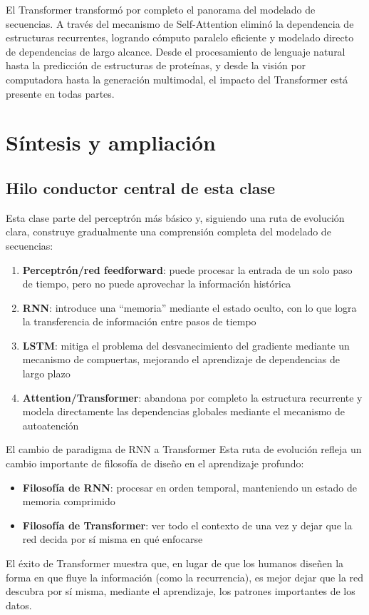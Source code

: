 \documentclass[a4paper]{article}
\begin{document}
El Transformer transformó por completo el panorama del modelado de secuencias. A través del mecanismo de Self-Attention eliminó la dependencia de estructuras recurrentes, logrando cómputo paralelo eficiente y modelado directo de dependencias de largo alcance. Desde el procesamiento de lenguaje natural hasta la predicción de estructuras de proteínas, y desde la visión por computadora hasta la generación multimodal, el impacto del Transformer está presente en todas partes.

\newpage
\section{Síntesis y ampliación}

\subsection{Hilo conductor central de esta clase}

Esta clase parte del perceptrón más básico y, siguiendo una ruta de evolución clara, construye gradualmente una comprensión completa del modelado de secuencias:

\begin{enumerate}
    \item \textbf{Perceptrón/red feedforward}: puede procesar la entrada de un solo paso de tiempo, pero no puede aprovechar la información histórica
    \item \textbf{RNN}: introduce una ``memoria'' mediante el estado oculto, con lo que logra la transferencia de información entre pasos de tiempo
    \item \textbf{LSTM}: mitiga el problema del desvanecimiento del gradiente mediante un mecanismo de compuertas, mejorando el aprendizaje de dependencias de largo plazo
    \item \textbf{Attention/Transformer}: abandona por completo la estructura recurrente y modela directamente las dependencias globales mediante el mecanismo de autoatención
\end{enumerate}

\begin{importantbox}{El cambio de paradigma de RNN a Transformer}
Esta ruta de evolución refleja un cambio importante de filosofía de diseño en el aprendizaje profundo:
\begin{itemize}
    \item \textbf{Filosofía de RNN}: procesar en orden temporal, manteniendo un estado de memoria comprimido
    \item \textbf{Filosofía de Transformer}: ver todo el contexto de una vez y dejar que la red decida por sí misma en qué enfocarse
\end{itemize}
El éxito de Transformer muestra que, en lugar de que los humanos diseñen la forma en que fluye la información (como la recurrencia), es mejor dejar que la red descubra por sí misma, mediante el aprendizaje, los patrones importantes de los datos.
\end{importantbox}
\end{document}
